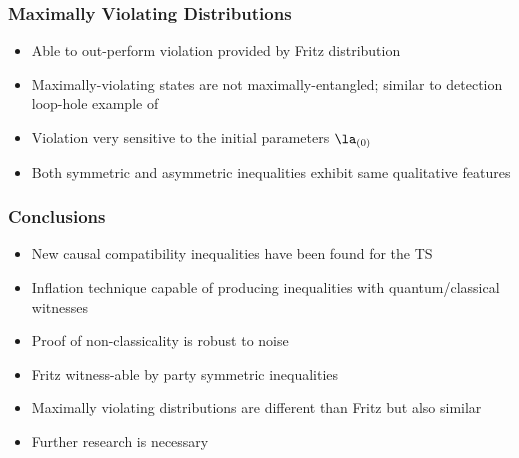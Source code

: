 \documentclass[
    hyperref={bookmarks=false},%
    xcolor={dvipsnames},
]{beamer}
\begin{document}
\begin{frame}
    \frametitle{Maximally Violating Distributions}
    \begin{itemize}
        \item Able to out-perform violation provided by Fritz distribution
        \item Maximally-violating states are not maximally-entangled; similar to detection loop-hole example of \cite{Methot_2006}
        \item Violation very sensitive to the initial parameters $\la_{(0)}$
        \item Both symmetric and asymmetric inequalities exhibit same qualitative features
    \end{itemize}
\end{frame}

\begin{frame}
    \frametitle{Conclusions}
    \begin{itemize}
        \item New causal compatibility inequalities have been found for the TS
        \item Inflation technique capable of producing inequalities with quantum/classical witnesses
        \item Proof of non-classicality is robust to noise
        \item Fritz witness-able by party symmetric inequalities
        \item Maximally violating distributions are different than Fritz but also similar
        \item Further research is necessary
    \end{itemize}
\end{frame}
\end{document}
